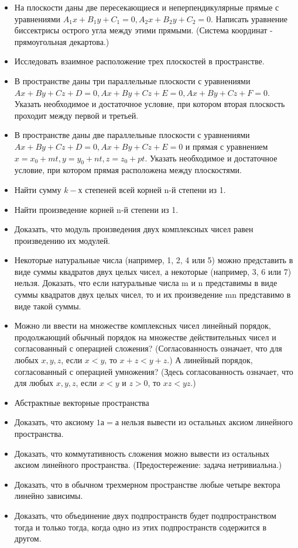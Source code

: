 \documentclass[a4paper]{article}
\begin{document}
\begin{itemize}
\item На плоскости даны две пересекающиеся и неперпендикулярные прямые с уравнениями $A_1x+B_1y+C_1=0, A_2x+B_2y+C_2=0$. Написать уравнение биссектрисы острого угла между этими прямыми. (Система координат - прямоугольная декартова.)
\item Исследовать взаимное расположение трех плоскостей в пространстве.
\item В пространстве даны три параллельные плоскости с уравнениями $Ax+By+Cz+D=0, Ax+By+Cz+E=0, Ax+By+Cz+F=0$. Указать необходимое и достаточное условие, при котором вторая плоскость проходит между первой и третьей.
\item В пространстве даны две параллельные плоскости с уравнениями $Ax+By+Cz+D=0, Ax+By+Cz+E=0$ и прямая с уравнением $x=x_0+mt, y=y_0+nt, z=z_0+pt$. Указать необходимое и достаточное условие, при котором прямая расположена между плоскостями.
\item Найти сумму $k-х$ степеней всей корней n-й степени из 1.
\item Найти произведение корней n-й степени из 1.
\item Доказать, что модуль произведения двух комплексных чисел равен произведению их модулей.
\item Некоторые натуральные числа (например, 1, 2, 4 или 5) можно представить в виде суммы квадратов двух целых чисел, а некоторые (например, 3, 6 или 7) нельзя. Доказать, что если натуральные числа m и n представимы в виде суммы квадратов двух целых чисел, то и их произведение mn представимо в виде такой суммы.
\item Можно ли ввести на множестве комплексных чисел линейный порядок, продолжающий обычный порядок на множестве действительных чисел и согласованный с операцией сложения? (Согласованность означает, что для любых $x,y,z$, если $x < y$, то $x+z < y+z$.) А линейный порядок, согласованный с операцией умножения? (Здесь согласованность означает, что для любых $x,y,z$, если $x < y$ и $z > 0$, то $xz < yz$.)
\item Абстрактные векторные пространства
\item Доказать, что аксиому $1а=а$ нельзя вывести из остальных аксиом линейного пространства.
\item Доказать, что коммутативность сложения можно вывести из остальных аксиом линейного пространства. (Предостережение: задача нетривиальна.)
\item Доказать, что в обычном трехмерном пространстве любые четыре вектора линейно зависимы.
\item Доказать, что объединение двух подпространств будет подпространством тогда и только тогда, когда одно из этих подпространств содержится в другом.

\end{itemize}
\end{document}

